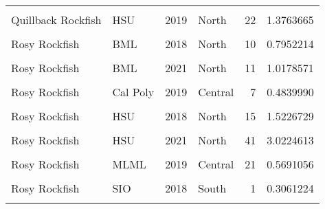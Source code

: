 \documentclass[
]{article}
\begin{document}
\begin{longtable}[t]{llrlrr}
\addlinespace
\cellcolor{gray!6}{Quillback Rockfish} & \cellcolor{gray!6}{HSU} & \cellcolor{gray!6}{2018} & \cellcolor{gray!6}{North} & \cellcolor{gray!6}{29} & \cellcolor{gray!6}{1.3084904}\\
Quillback Rockfish & HSU & 2019 & North & 22 & 1.3763665\\
\cellcolor{gray!6}{Quillback Rockfish} & \cellcolor{gray!6}{HSU} & \cellcolor{gray!6}{2021} & \cellcolor{gray!6}{North} & \cellcolor{gray!6}{15} & \cellcolor{gray!6}{1.3979819}\\
Rosy Rockfish & BML & 2018 & North & 10 & 0.7952214\\
\cellcolor{gray!6}{Rosy Rockfish} & \cellcolor{gray!6}{BML} & \cellcolor{gray!6}{2019} & \cellcolor{gray!6}{North} & \cellcolor{gray!6}{10} & \cellcolor{gray!6}{0.9668016}\\
\addlinespace
Rosy Rockfish & BML & 2021 & North & 11 & 1.0178571\\
\cellcolor{gray!6}{Rosy Rockfish} & \cellcolor{gray!6}{Cal Poly} & \cellcolor{gray!6}{2018} & \cellcolor{gray!6}{Central} & \cellcolor{gray!6}{6} & \cellcolor{gray!6}{0.3469746}\\
Rosy Rockfish & Cal Poly & 2019 & Central & 7 & 0.4839990\\
\cellcolor{gray!6}{Rosy Rockfish} & \cellcolor{gray!6}{Cal Poly} & \cellcolor{gray!6}{2021} & \cellcolor{gray!6}{Central} & \cellcolor{gray!6}{11} & \cellcolor{gray!6}{0.5972627}\\
Rosy Rockfish & HSU & 2018 & North & 15 & 1.5226729\\
\addlinespace
\cellcolor{gray!6}{Rosy Rockfish} & \cellcolor{gray!6}{HSU} & \cellcolor{gray!6}{2019} & \cellcolor{gray!6}{North} & \cellcolor{gray!6}{20} & \cellcolor{gray!6}{2.0122027}\\
Rosy Rockfish & HSU & 2021 & North & 41 & 3.0224613\\
\cellcolor{gray!6}{Rosy Rockfish} & \cellcolor{gray!6}{MLML} & \cellcolor{gray!6}{2018} & \cellcolor{gray!6}{Central} & \cellcolor{gray!6}{26} & \cellcolor{gray!6}{0.8209869}\\
Rosy Rockfish & MLML & 2019 & Central & 21 & 0.5691056\\
\cellcolor{gray!6}{Rosy Rockfish} & \cellcolor{gray!6}{MLML} & \cellcolor{gray!6}{2021} & \cellcolor{gray!6}{Central} & \cellcolor{gray!6}{13} & \cellcolor{gray!6}{0.5916178}\\
\addlinespace
Rosy Rockfish & SIO & 2018 & South & 1 & 0.3061224\\
\cellcolor{gray!6}{Rosy Rockfish} & \cellcolor{gray!6}{SIO} & \cellcolor{gray!6}{2019} & \cellcolor{gray!6}{South} & \cellcolor{gray!6}{1} & \cellcolor{gray!6}{0.3750000}\\

\end{longtable}
\end{document}

